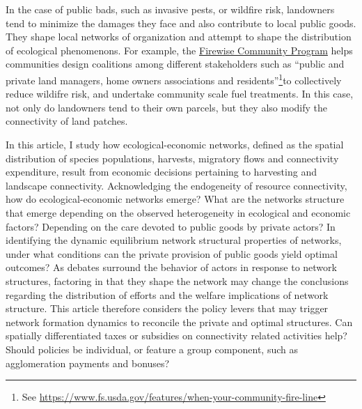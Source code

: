 \documentclass{article}
\begin{document}
In the case of public bads, such as invasive pests, or wildfire risk, landowners tend to minimize the damages they face and also contribute to local public goods. They shape local networks of organization and attempt to shape the distribution of ecological phenomenons. For example, the \href{https://www.nfpa.org/education-and-research/wildfire/firewise-usa}{Firewise Community Program} helps communities design coalitions among different stakeholders such as \enquote{public and private land managers, home owners associations and residents}\footnote{See \url{https://www.fs.usda.gov/features/when-your-community-fire-line}}to collectively reduce wildifre risk, and undertake community scale fuel treatments. In this case, not only do landowners tend to their own parcels, but they also modify the connectivity of land patches. 

In this article, I study how ecological-economic networks, defined as the spatial distribution of species populations, harvests, migratory flows and connectivity expenditure, result from economic decisions pertaining to harvesting and landscape connectivity. Acknowledging the endogeneity of resource connectivity, how do ecological-economic networks emerge? What are the networks structure that emerge depending on the observed heterogeneity in ecological and economic factors? Depending on the care devoted to public goods by private actors? In identifying the dynamic equilibrium network structural properties of networks, under what conditions can the private provision of public goods yield optimal outcomes? As debates surround the behavior of actors in response to network structures, factoring in that they shape the network may change the conclusions regarding the distribution of efforts and the welfare implications of network structure. This article therefore considers the policy levers that may trigger network formation dynamics to reconcile the private and optimal structures. Can spatially differentiated taxes or subsidies on connectivity related activities help? Should policies be individual, or feature a group component, such as agglomeration payments and bonuses?
\end{document}
